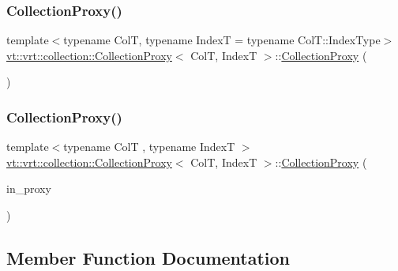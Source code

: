 \subsubsection{\texorpdfstring{Collection\+Proxy()}{CollectionProxy()}\hspace{0.1cm}{\footnotesize\ttfamily [2/3]}}
{\footnotesize\ttfamily template$<$typename ColT, typename IndexT = typename Col\+T\+::\+Index\+Type$>$ \\
\hyperlink{structvt_1_1vrt_1_1collection_1_1_collection_proxy}{vt\+::vrt\+::collection\+::\+Collection\+Proxy}$<$ ColT, IndexT $>$\+::\hyperlink{structvt_1_1vrt_1_1collection_1_1_collection_proxy}{Collection\+Proxy} (\begin{DoxyParamCaption}\item[{\hyperlink{structvt_1_1vrt_1_1collection_1_1_collection_proxy}{Collection\+Proxy}$<$ ColT, IndexT $>$ const \&}]{ }\end{DoxyParamCaption})\hspace{0.3cm}{\ttfamily [default]}}

\mbox{\label{structvt_1_1vrt_1_1collection_1_1_collection_proxy_ac4762724e6b3c028f183b42f635d69ce}} 
\subsubsection{\texorpdfstring{Collection\+Proxy()}{CollectionProxy()}\hspace{0.1cm}{\footnotesize\ttfamily [3/3]}}
{\footnotesize\ttfamily template$<$typename ColT , typename IndexT $>$ \\
\hyperlink{structvt_1_1vrt_1_1collection_1_1_collection_proxy}{vt\+::vrt\+::collection\+::\+Collection\+Proxy}$<$ ColT, IndexT $>$\+::\hyperlink{structvt_1_1vrt_1_1collection_1_1_collection_proxy}{Collection\+Proxy} (\begin{DoxyParamCaption}\item[{\hyperlink{namespacevt_a1b417dd5d684f045bb58a0ede70045ac}{Virtual\+Proxy\+Type} const}]{in\+\_\+proxy }\end{DoxyParamCaption})}



\subsection{Member Function Documentation}
\mbox{\label{structvt_1_1vrt_1_1collection_1_1_collection_proxy_a9dcc562f78ac9f7dbef426c33c3b6f53}} 

